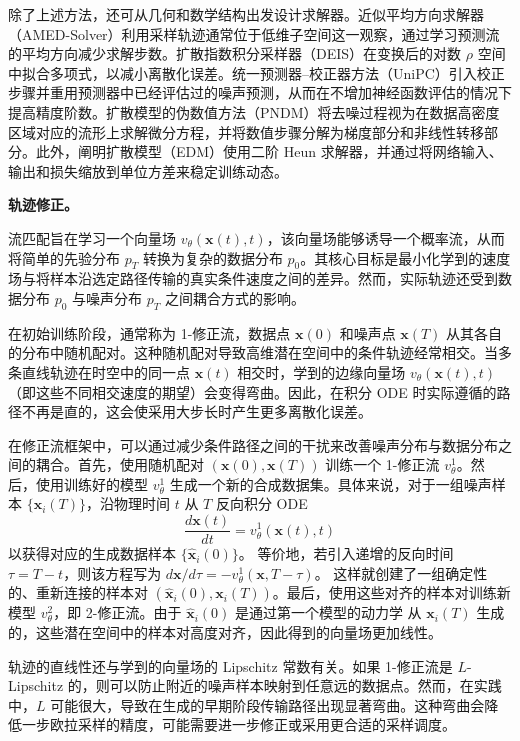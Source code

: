 除了上述方法，还可从几何和数学结构出发设计求解器。近似平均方向求解器（AMED-Solver）利用采样轨迹通常位于低维子空间这一观察，通过学习预测流的平均方向减少求解步数。扩散指数积分采样器（DEIS）在变换后的对数 $\rho$ 空间中拟合多项式，以减小离散化误差。统一预测器--校正器方法（UniPC）引入校正步骤并重用预测器中已经评估过的噪声预测，从而在不增加神经函数评估的情况下提高精度阶数。扩散模型的伪数值方法（PNDM）将去噪过程视为在数据高密度区域对应的流形上求解微分方程，并将数值步骤分解为梯度部分和非线性转移部分。此外，阐明扩散模型（EDM）使用二阶 Heun 求解器，并通过将网络输入、输出和损失缩放到单位方差来稳定训练动态。

\textbf{轨迹修正。}

流匹配旨在学习一个向量场 $v_\theta(\mathbf{x}(t), t)$，该向量场能够诱导一个概率流，从而将简单的先验分布 $p_T$ 转换为复杂的数据分布 $p_0$。其核心目标是最小化学到的速度场与将样本沿选定路径传输的真实条件速度之间的差异。然而，实际轨迹还受到数据分布 $p_0$ 与噪声分布 $p_T$ 之间耦合方式的影响。

在初始训练阶段，通常称为 1-修正流，数据点 $\mathbf{x}(0)$ 和噪声点 $\mathbf{x}(T)$ 从其各自的分布中随机配对。这种随机配对导致高维潜在空间中的条件轨迹经常相交。当多条直线轨迹在时空中的同一点 $\mathbf{x}(t)$ 相交时，学到的边缘向量场 $v_\theta(\mathbf{x}(t), t)$（即这些不同相交速度的期望）会变得弯曲。因此，在积分 ODE 时实际遵循的路径不再是直的，这会使采用大步长时产生更多离散化误差。

在修正流框架中，可以通过减少条件路径之间的干扰来改善噪声分布与数据分布之间的耦合。首先，使用随机配对 $(\mathbf{x}(0), \mathbf{x}(T))$ 训练一个 1-修正流 $v_{\theta}^1$。然后，使用训练好的模型 $v_{\theta}^1$ 生成一个新的合成数据集。具体来说，对于一组噪声样本 $\{\mathbf{x}_i(T)\}$，沿物理时间 $t$ 从 $T$ 反向积分 ODE
\[
\frac{d\mathbf{x}(t)}{dt}=v_{\theta}^1(\mathbf{x}(t),t)
\]
以获得对应的生成数据样本 $\{\hat{\mathbf{x}}_i(0)\}$。
等价地，若引入递增的反向时间 $\tau=T-t$，则该方程写为
$d\mathbf{x}/d\tau=-v_{\theta}^1(\mathbf{x},T-\tau)$。
这样就创建了一组确定性的、重新连接的样本对
$(\hat{\mathbf{x}}_i(0), \mathbf{x}_i(T))$。最后，使用这些对齐的样本对训练新模型
$v_{\theta}^2$，即 2-修正流。由于 $\hat{\mathbf{x}}_i(0)$ 是通过第一个模型的动力学
从 $\mathbf{x}_i(T)$ 生成的，这些潜在空间中的样本对高度对齐，因此得到的向量场更加线性。

轨迹的直线性还与学到的向量场的 Lipschitz 常数有关。如果 1-修正流是 $L$-Lipschitz 的，则可以防止附近的噪声样本映射到任意远的数据点。然而，在实践中，$L$ 可能很大，导致在生成的早期阶段传输路径出现显著弯曲。这种弯曲会降低一步欧拉采样的精度，可能需要进一步修正或采用更合适的采样调度。

